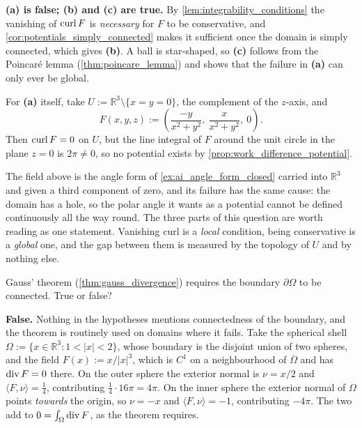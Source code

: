 \begin{answer}
\textbf{(a) is false; (b) and (c) are true.} By \cref{lem:integrability_conditions} the
vanishing of $\operatorname{curl} F$ is \emph{necessary} for $F$ to be conservative, and
\cref{cor:potentials_simply_connected} makes it sufficient once the domain is simply connected,
which gives \textbf{(b)}. A ball is star-shaped, so \textbf{(c)} follows from the Poincaré lemma
(\cref{thm:poincare_lemma}) and shows that the failure in \textbf{(a)} can only ever be global.

For \textbf{(a)} itself, take $U := \mathbb{R}^3\setminus\{x = y = 0\}$, the complement of the
$z$-axis, and
\[F(x,y,z) := \left(\frac{-y}{x^2+y^2},\ \frac{x}{x^2+y^2},\ 0\right).\]
Then $\operatorname{curl} F = 0$ on $U$, but the line integral of $F$ around the unit circle in the plane
$z = 0$ is $2\pi \neq 0$, so no potential exists by \cref{prop:work_difference_potential}.
\end{answer}

\begin{ainote}
The field above is the angle form of \cref{ex:ai_angle_form_closed} carried into
$\mathbb{R}^3$ and given a third component of zero, and its failure has the same cause: the
domain has a hole, so the polar angle it wants as a potential cannot be defined continuously all
the way round. The three parts of this question are worth reading as one statement. Vanishing
curl is a \emph{local} condition, being conservative is a \emph{global} one, and the gap between
them is measured by the topology of $U$ and by nothing else.
\end{ainote}

\begin{question}
\label{q:quiz_q12}
Gauss' theorem (\cref{thm:gauss_divergence}) requires the boundary $\partial\Omega$ to be
connected. True or false?
\end{question}

\begin{answer}
\textbf{False.} Nothing in the hypotheses mentions connectedness of the boundary, and the
theorem is routinely used on domains where it fails. Take the spherical shell
$\Omega := \{x \in \mathbb{R}^3 : 1 < \lvert x\rvert < 2\}$, whose boundary is the disjoint
union of two spheres, and the field $F(x) := x/\lvert x\rvert^3$, which is $C^1$ on a
neighbourhood of $\overline\Omega$ and has $\operatorname{div} F = 0$ there. On the outer sphere the exterior
normal is $\nu = x/2$ and $\langle F,\nu\rangle = \tfrac14$, contributing
$\tfrac14 \cdot 16\pi = 4\pi$. On the inner sphere the exterior normal of $\Omega$ points
\emph{towards} the origin, so $\nu = -x$ and $\langle F,\nu\rangle = -1$, contributing
$-4\pi$. The two add to $0 = \int_\Omega\operatorname{div} F$, as the theorem requires.
\end{answer}

